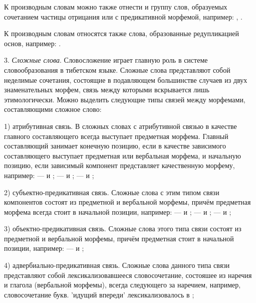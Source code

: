 К производным словам можно также отнести и группу слов, образуемых сочетанием частицы отрицания  или  с предикативной морфемой, например: , .

К производным словам относятся также слова, образованные редупликацией основ, например: .

3. \emph{Сложные слова}. Словосложение играет главную роль в системе словообразования в тибетском языке. Сложные слова представляют собой неделимые сочетания, состоящие в подавляющем большинстве случаев из двух знаменательных морфем, связь между которыми вскрывается лишь этимологически. Можно выделить следующие типы связей между морфемами, составляющими сложное слово:

1) атрибутивная связь. В сложных словах с атрибутивной связью в качестве главного составляющего всегда выступает предметная морфема. Главный составляющий занимает конечную позицию, если в качестве зависимого составляющего выступает предметная или вербальная морфема, и начальную позицию, если зависимый компонент представляет качественную морфему, например: 
 ---  и ;
 ---  и ;
 ---  и ;

2) субъектно-предикативная связь. Сложные слова с этим типом связи компонентов состоят из предметной и вербальной морфемы, причём предметная морфема всегда стоит в начальной позиции, например:
 ---  и ;
 ---  и ;
 ---  и ;

3) объектно-предикативная связь. Сложные слова этого типа связи состоят из предметной и вербальной морфемы, причём предметная стоит в начальной позиции, например:  ---  и ;

4) адвербиально-предикативная связь. Сложные слова данного типа связи представляют собой лексикализовавшееся словосочетание, состояшее из наречия и глагола (вербальной морфемы), всегда следующего за наречием, например, словосочетание  букв. 'идущий впереди'	лексикализовалось в ;

